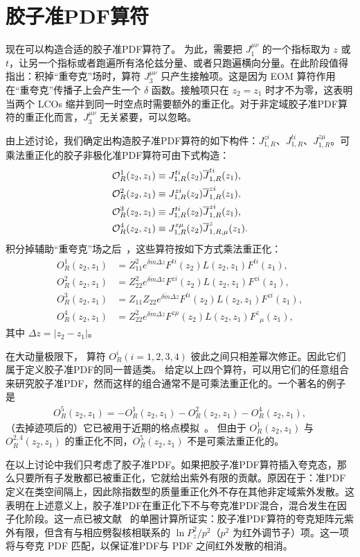 \section{胶子准PDF算符}\label{sec:operators}

现在可以构造合适的胶子准PDF算符了。
为此，需要把 $J_1^{\mu\nu}$ 的一个指标取为 $z$ 或 $t$，让另一个指标或者跑遍所有洛伦兹分量、或者只跑遍横向分量。在此阶段值得指出：积掉“重夸克”场时，算符 $J_3^{\mu\nu}$ 只产生接触项。这是因为 EOM 算符作用在“重夸克”传播子上会产生一个 $\delta$ 函数。接触项只在 $z_2=z_1$ 时才不为零，这表明当两个 LCOs 缩并到同一时空点时需要额外的重正化。对于非定域胶子准PDF算符的重正化而言，$J_3^{\mu\nu}$ 无关紧要，可以忽略。

由上述讨论，我们确定出构造胶子准PDF算符的如下构件：$J_{1,R}^{zi}$、$J_{1,R}^{ti}$、$J_{1,R}^{z\mu}$。可乘法重正化的胶子非极化准PDF算符可由下式构造：
\begin{align}
 {\cal O}^{1}_R(z_2,z_1) &\equiv  J_{1,R}^{ti}(z_2) \overline J_{1,R}^{ti}(z_1), \nonumber\\
 {\cal O}^{2}_R(z_2,z_1) &\equiv  J_{1,R}^{zi}(z_2)\overline J_{1,R}^{zi}(z_1), \nonumber\\
 {\cal O}^{3}_R(z_2, z_1) &\equiv    J_{1,R}^{ti}(z_2) \overline J_{1,R}^{zi}(z_1),\nonumber\\
 {\cal O}^{4}_R(z_2, z_1)  &\equiv  J_{1,R}^{z\mu}(z_2) \overline J_{1,R,\mu}^{z}(z_1).
\end{align}
积分掉辅助“重夸克”场之后~\cite{Ji:2017oey}，这些算符按如下方式乘法重正化：
\begin{align}
{O}^{1}_R(z_2, z_1) &=Z_{11}^2 e^{\overline{\delta { m}}\Delta z}F^{ti}(z_2) L(z_2,z_1) F^{ti}(z_1),\nonumber\\
 {  O}^{2}_R(z_2,z_1) &=Z_{22}^2 e^{\overline{\delta { m}}\Delta z} F^{zi}(z_2) L(z_2,z_1) F^{zi}(z_1),\nonumber\\
 {O}^{3}_R(z_2,z_1) &= Z_{11}Z_{22} e^{\overline{\delta { m}}\Delta z} F^{ti}(z_2) L(z_2,z_1) F^{zi}(z_1),\nonumber\\
O^{4}_R(z_2,z_1)
& = Z_{22}^2 e^{\overline{\delta { m}}\Delta z} F^{z\mu}(z_2) L(z_2,z_1) F^{z}_{\;\;\mu}(z_1),
 \end{align}
其中 $\Delta z=|z_2-z_1|$。

在大动量极限下，
算符 $O^{i}_R(i=1,2,3,4)$ 彼此之间只相差幂次修正。因此它们属于定义胶子准PDF的同一普适类。
给定以上四个算符，可以用它们的任意组合来研究胶子准PDF，然而这样的组合通常不是可乘法重正化的。一个著名的例子是
\begin{align}
{  O}^{5}_R(z_2,z_1)
 =    -  {  O}^{1}_R(z_2,z_1)-  {  O}^2_R(z_2, z_1)-{  O}^4_R(z_2, z_1),
\end{align}
（去掉迹项后的）它已被用于近期的格点模拟~\cite{Fan:2018dxu}。
但由于 ${  O}^{1}_R(z_2,z_1)$ 与 ${  O}_R^{2,4}(z_2, z_1)$ 的重正化不同，${  O}_R^{5}(z_2,z_1)$ 不是可乘法重正化的。

在以上讨论中我们只考虑了胶子准PDF。如果把胶子准PDF算符插入夸克态，那么只要所有子发散都已被重正化，它就给出紫外有限的贡献。原因在于：准PDF定义在类空间隔上，因此除指数型的质量重正化外不存在其他非定域紫外发散。这表明在上述意义上，胶子准PDF在重正化下不与夸克准PDF混合，混合发生在因子化阶段。这一点已被文献~\cite{Wang:2017qyg} 的单圈计算所证实：胶子准PDF算符的夸克矩阵元紫外有限，但含有与相应劈裂核相联系的 $\ln P_z^2/p^2$（$p^2$ 为红外调节子）项。这一项将与夸克 PDF 匹配，以保证准PDF与 PDF 之间红外发散的相消。
